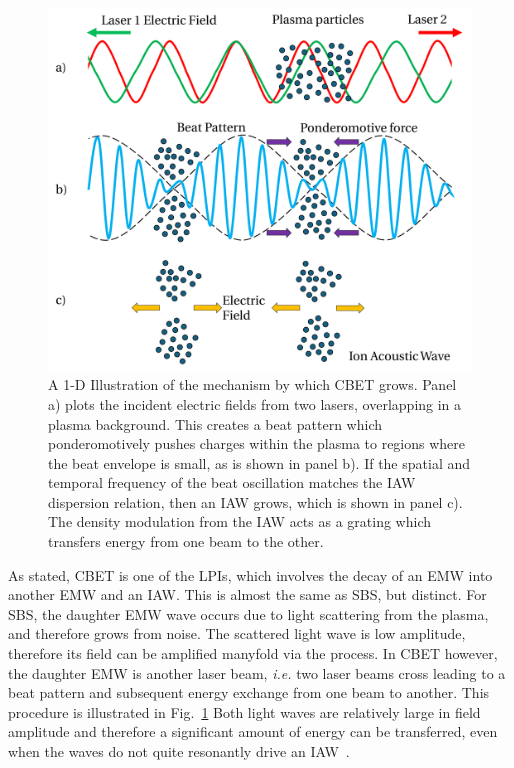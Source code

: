 \begin{figure}[t!]
    \includegraphics[width=0.8\linewidth]{Theory/Images/CBET_mechanism.png}
    \centering
    \caption{A 1-D Illustration of the mechanism by which \ac{CBET} grows.
    Panel a) plots the incident electric fields from two lasers, overlapping in a plasma background.
    This creates a beat pattern which ponderomotively pushes charges within the plasma to regions where the beat envelope is small, as is shown in panel b).
    If the spatial and temporal frequency of the beat oscillation matches the \ac{IAW} dispersion relation, then an \ac{IAW} grows, which is shown in panel c).
    The density modulation from the \ac{IAW} acts as a grating which transfers energy from one beam to the other.
    }%
    \label{fig:theory_CBET_mechanism}
\end{figure}

As stated, \ac{CBET} is one of the \ac{LPIs}, which involves the decay of an \ac{EMW} into another \ac{EMW} and an \ac{IAW}.
This is almost the same as \ac{SBS}, but distinct.
For \ac{SBS}, the daughter \ac{EMW} wave occurs due to light scattering from the plasma, and therefore grows from noise.
The scattered light wave is low amplitude, therefore its field can be amplified manyfold via the process.
In \ac{CBET} however, the daughter \ac{EMW} is another laser beam, \textit{i.e.} two laser beams cross leading to a beat pattern and subsequent energy exchange from one beam to another.
This procedure is illustrated in Fig.~\ref{fig:theory_CBET_mechanism}
Both light waves are relatively large in field amplitude and therefore a significant amount of energy can be transferred, even when the waves do not quite resonantly drive an \ac{IAW}~\cite{michel_introduction_2023}.

